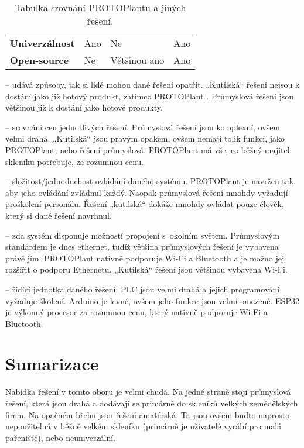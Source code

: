 \begin{table}[h]
{\begin{tabular}{@{}l|lll@{}}
    \textbf{Univerzálnost}& Ano                       & Ne                         & Ano                                                                                                   \\ 
    \textbf{Open-source} & Ne                         & Většinou ano               & Ano                                                                                                   \\ \bottomrule    
    \end{tabular}%
    }
    \caption{Tabulka srovnání PROTOPlantu a jiných řešení.}
    \label{tab:COMPARATION}
\end{table}

\noindent{} -- udává způsoby, jak si lidé mohou dané řešení opatřit.
„Kutilská“ řešení nejsou k dostání jako již hotový produkt, zatímco PROTO\-Plant . \newline
Průmyslová řešení jsou většinou již k dostání jako hotové produkty.

\noindent{} -- srovnání cen jednotlivých řešení.
Průmyslová řešení jsou komplexní, ovšem velmi drahá.
„Kutilská“ jsou pravým opakem, ovšem nemají tolik funkcí, jako PROTOPlant, nebo řešení průmyslová.
PROTOPlant má vše, co běžný majitel skleníku potřebuje, za rozumnou cenu. \newline

\noindent{} -- složitost/jednoduchost ovládání daného systému.
PROTOPlant je navržen tak, aby jeho ovládání zvládnul každý.
Naopak průmyslová řešení mnohdy vyžadují proškolení personálu.
Řešení „kutilská“ dokáže mnohdy ovládat pouze člověk, který si dané řešení navrhnul. \newline

\noindent{} -- zda systém disponuje možností propojení s~okolním světem.
Průmyslovým standardem je dnes ethernet, tudíž většina průmyslových řešení je vybavena právě jím.
PROTOPlant nativně podporuje Wi-Fi a Bluetooth a je možno jej rozšířit o podporu Ethernetu.
„Kutilská“ řešení jsou většinou vybavena Wi-Fi. \newline

\noindent{} -- řídící jednotka daného řešení.
PLC jsou velmi drahá a jejich programování vyžaduje školení.
Arduino je levné, ovšem jeho funkce jsou velmi omezené.
ESP32 je výkonný procesor za rozumnou cenu, který nativně podporuje Wi-Fi a Bluetooth. \newline

\section{Sumarizace}
Nabídka řešení v tomto oboru je velmi chudá.
Na jedné straně stojí průmyslová řešení, která jsou drahá a dodávají se primárně do skleníků velkých zemědělských firem.
Na opačném břehu jsou řešení amatérská. 
Ta jsou ovšem buďto naprosto nepoužitelná v běžně velkém skleníku (primárně je uživatelé vyrábí pro malá pařeniště), nebo neuniverzální.

\newpage